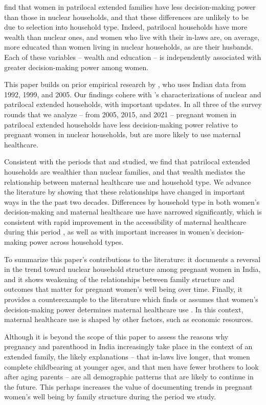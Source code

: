 \documentclass[10pt,twoside,reqno]{article}
\begin{document}
\cite{khalil2019patrilocal} find that women in patrilocal extended families have less decision-making power than those in nuclear households, and that these differences are unlikely to be due to selection into household type. Indeed, patrilocal households have more wealth than nuclear ones, and women who live with their in-laws are, on average, more educated than women living in nuclear households, as are their husbands.  Each of these variables -- wealth and education -- is independently associated with greater decision-making power among women.

This paper builds on prior empirical research by \cite{allendorf2013going}, who uses Indian data from 1992, 1999, and 2005.  Our findings cohere with  \cite{allendorf2013going}'s characterizations of nuclear and patrilocal extended households, with important updates.  In all three of the survey rounds that we analyze -- from 2005, 2015, and 2021 -- pregnant women in patrilocal extended households have less decision-making power relative to pregnant women in nuclear households, but are more likely to use maternal healthcare. 

Consistent with the periods that \cite{allendorf2013going} and \cite{khalil2019patrilocal} studied, we find that patrilocal extended households are wealthier than nuclear families, and that wealth mediates the relationship between maternal healthcare use and household type. We advance the literature by showing that these relationships have changed in important ways in the the past two decades.  Differences by household type in both women's decision-making and maternal healthcare use have narrowed significantly, which is consistent with rapid improvement in the accessibility of maternal healthcare during this period \citep{gandhi2022predictors, rai2022use}, as well as with important increases in women's decision-making power across household types.  

To summarize this paper's contributions to the literature: it documents a reversal in the trend toward nuclear household structure among pregnant women in India, and it shows weakening of the relationships between family structure and outcomes that matter for pregnant women's well being over time.  Finally, it provides a counterexample to the literature which finds or assumes that women's decision-making power determines maternal healthcare use \citep{majumder2024does,mistry2009women}.  In this context, maternal healthcare use is shaped by other factors, such as economic resources.  

Although it is beyond the scope of this paper to assess the reasons why pregnancy and parenthood in India increasingly take place in the context of an extended family, the likely explanations -- that in-laws live longer, that women complete childbearing at younger ages, and that men have fewer brothers to look after aging parents -- are all demographic patterns that are likely to continue in the future.  This perhaps increases the value of documenting trends in pregnant women's well being by family structure during the period we study.
\end{document}
